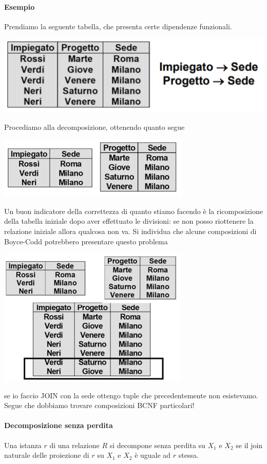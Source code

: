 \paragraph{Esempio} Prendiamo la seguente tabella, che presenta certe dipendenze funzionali. 
\begin{center}
	\includegraphics{images/143.PNG}
\end{center}
Procediamo alla decomposizione, ottenendo quanto segue
\begin{center}
	\includegraphics{images/144.PNG}
\end{center}
Un buon indicatore della correttezza di quanto stiamo facendo è la ricomposizione della tabella iniziale dopo aver effettuato le divisioni: se non posso riottenere la relazione iniziale allora qualcosa non va. Si individua che alcune composizioni di Boyce-Codd potrebbero presentare questo problema
\begin{center}
	\includegraphics{images/145.PNG}
\end{center}
se io faccio JOIN con la sede ottengo tuple che precedentemente non esistevamo. Segue che dobbiamo trovare composizioni BCNF particolari!
\paragraph{Decomposizione senza perdita} Una istanza $r$ di una relazione $R$ si decompone senza perdita su $X_1$ e $X_2$ se il join naturale delle proiezione di $r$ su $X_1$ e $X_2$ è uguale ad $r$ stessa.
